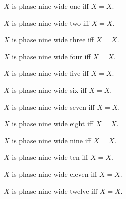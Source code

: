 

\begin{definition}\label{notion_wide_one}
    $X$ is phase nine wide one iff $X=X$.
\end{definition}

\begin{definition}\label{notion_wide_two}
    $X$ is phase nine wide two iff $X=X$.
\end{definition}

\begin{definition}\label{notion_wide_three}
    $X$ is phase nine wide three iff $X=X$.
\end{definition}

\begin{definition}\label{notion_wide_four}
    $X$ is phase nine wide four iff $X=X$.
\end{definition}

\begin{definition}\label{notion_wide_five}
    $X$ is phase nine wide five iff $X=X$.
\end{definition}

\begin{definition}\label{notion_wide_six}
    $X$ is phase nine wide six iff $X=X$.
\end{definition}

\begin{definition}\label{notion_wide_seven}
    $X$ is phase nine wide seven iff $X=X$.
\end{definition}

\begin{definition}\label{notion_wide_eight}
    $X$ is phase nine wide eight iff $X=X$.
\end{definition}

\begin{definition}\label{notion_wide_nine}
    $X$ is phase nine wide nine iff $X=X$.
\end{definition}

\begin{definition}\label{notion_wide_ten}
    $X$ is phase nine wide ten iff $X=X$.
\end{definition}

\begin{definition}\label{notion_wide_eleven}
    $X$ is phase nine wide eleven iff $X=X$.
\end{definition}

\begin{definition}\label{notion_wide_twelve}
    $X$ is phase nine wide twelve iff $X=X$.
\end{definition}

